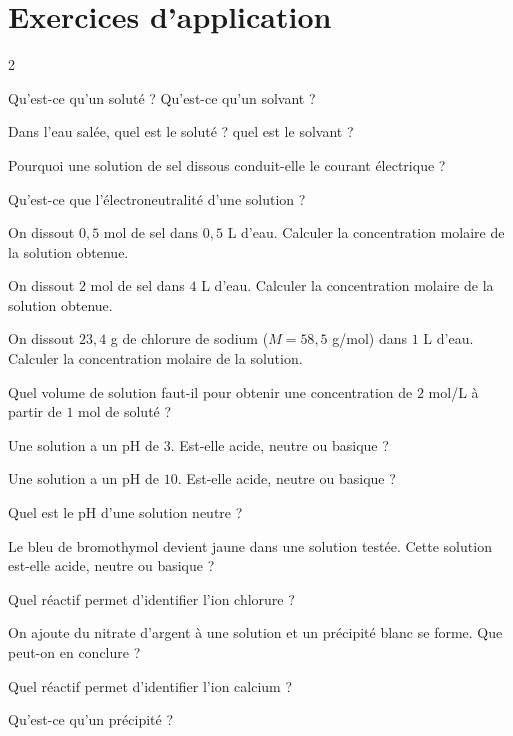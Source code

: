 \section{Exercices d'application}
\begin{multicols}{2}

\exo{} Qu'est-ce qu'un soluté ? Qu'est-ce qu'un solvant ?

\exo{} Dans l'eau salée, quel est le soluté ? quel est le solvant ?

\exo{} Pourquoi une solution de sel dissous conduit-elle le courant électrique ?

\exo{} Qu'est-ce que l'électroneutralité d'une solution ?

\exo{} On dissout $0{,}5$ mol de sel dans $0{,}5$ L d'eau. Calculer la
concentration molaire de la solution obtenue.

\exo{} On dissout $2$ mol de sel dans $4$ L d'eau. Calculer la concentration
molaire de la solution obtenue.

\exo{} On dissout $23{,}4$ g de chlorure de sodium ($M=58{,}5$ g/mol) dans $1$ L
d'eau. Calculer la concentration molaire de la solution.

\exo{} Quel volume de solution faut-il pour obtenir une concentration de $2$
mol/L à partir de $1$ mol de soluté ?

\exo{} Une solution a un pH de $3$. Est-elle acide, neutre ou basique ?

\exo{} Une solution a un pH de $10$. Est-elle acide, neutre ou basique ?

\exo{} Quel est le pH d'une solution neutre ?

\exo{} Le bleu de bromothymol devient jaune dans une solution testée. Cette
solution est-elle acide, neutre ou basique ?

\exo{} Quel réactif permet d'identifier l'ion chlorure ?

\exo{} On ajoute du nitrate d'argent à une solution et un précipité blanc se
forme. Que peut-on en conclure ?

\exo{} Quel réactif permet d'identifier l'ion calcium ?

\exo{} Qu'est-ce qu'un précipité ?

\end{multicols}

